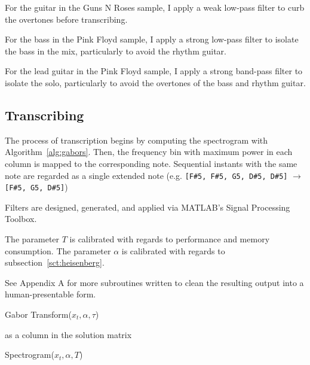 \documentclass{article}
\begin{document}
For the guitar in the Guns N Roses sample, I apply a weak low-pass filter to curb the overtones before transcribing.

For the bass in the Pink Floyd sample, I apply a strong low-pass filter to isolate the bass in the mix, particularly to avoid the rhythm guitar.

For the lead guitar in the Pink Floyd sample, I apply a strong band-pass filter to isolate the solo, particularly to avoid the overtones of the bass and rhythm guitar.


\subsection{Transcribing}
The process of transcription begins by computing the spectrogram with Algorithm~\ref{alg:gabors}. Then, the frequency bin with maximum power in each column is mapped to the corresponding note. Sequential instants with the same note are regarded as a single extended note (e.g. \texttt{[F\#5, F\#5, G5, D\#5, D\#5]} $\longrightarrow$ \texttt{[F\#5, G5, D\#5]})

Filters are designed, generated, and applied via MATLAB's Signal Processing Toolbox.



The parameter $T$ is calibrated with regards to performance and memory consumption. The parameter $\alpha$ is calibrated with regards to subsection~\ref{sct:heisenberg}.

See Appendix A for more subroutines written to clean the resulting output into a human-presentable form.


\begin{algorithm}[!t]
\begin{algorithmic}
\end{algorithmic}
\caption{Gabor Transform($x_t,\alpha,\tau$)}
\label{alg:gabor}
\end{algorithm}

\begin{algorithm}[!t]
	\begin{algorithmic}
		 as a column in the solution matrix 
		\ENDFOR{}
	\end{algorithmic}
	\caption{Spectrogram($x_t, \alpha, T$)}
	\label{alg:gabors}
\end{algorithm}
\end{document}
